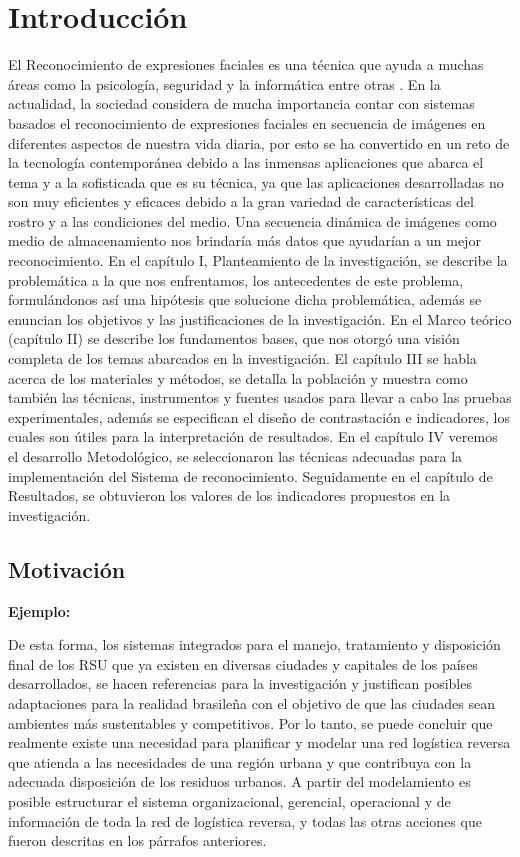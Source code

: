 \chapter{Introducción}
\setcounter{page}{1}
El Reconocimiento de expresiones faciales es una técnica que ayuda a muchas áreas como la psicología, seguridad y la informática entre otras . 
\vskip 0.3cm
En la actualidad, la sociedad considera de mucha importancia contar con sistemas basados el reconocimiento de expresiones faciales en secuencia de imágenes en diferentes aspectos de nuestra vida diaria, por esto se ha convertido en un reto de la tecnología contemporánea debido a las inmensas aplicaciones que abarca el tema y a la sofisticada que es su técnica, ya que las aplicaciones desarrolladas no son muy eficientes y eficaces debido a la gran variedad de características del rostro y a las condiciones del medio. Una secuencia dinámica de imágenes como medio de almacenamiento nos brindaría más datos que ayudarían a un mejor reconocimiento. 
\vskip 0.3cm
En el capítulo I, Planteamiento de la investigación, se describe la problemática a la que nos enfrentamos, los antecedentes de este problema, formulándonos así una hipótesis que solucione dicha problemática, además se enuncian los objetivos y las justificaciones de la investigación. En el Marco teórico (capítulo II) se describe los fundamentos bases, que nos otorgó una visión completa de los temas abarcados en la investigación. El capítulo III se habla acerca de los materiales y métodos, se detalla la población y muestra como también las técnicas, instrumentos y fuentes usados para llevar a cabo las pruebas experimentales, además se especifican el diseño de contrastación e indicadores, los cuales son útiles para la interpretación de resultados. En el capítulo IV veremos el desarrollo Metodológico, se seleccionaron las técnicas adecuadas para la implementación del Sistema de reconocimiento. Seguidamente en el capítulo de Resultados, se obtuvieron los valores de los indicadores propuestos en la investigación.
   

\section{Motivación}

{\bf Ejemplo:}\par

De esta forma, los sistemas integrados para el manejo, tratamiento y disposición final de los RSU que ya existen en diversas ciudades y capitales de los países desarrollados, se hacen referencias para la investigación y justifican posibles adaptaciones para la realidad brasileña con el objetivo de que las ciudades sean ambientes más sustentables y competitivos.
\vskip 0.3cm
 Por lo tanto, se puede concluir que realmente existe una necesidad para planificar y modelar una red logística reversa que atienda a las necesidades de una región urbana y que contribuya con la adecuada disposición de los residuos urbanos. A partir del modelamiento es posible estructurar el sistema organizacional, gerencial, operacional y de información de toda la red  de logística reversa, y todas las otras acciones que fueron descritas en los párrafos anteriores.


